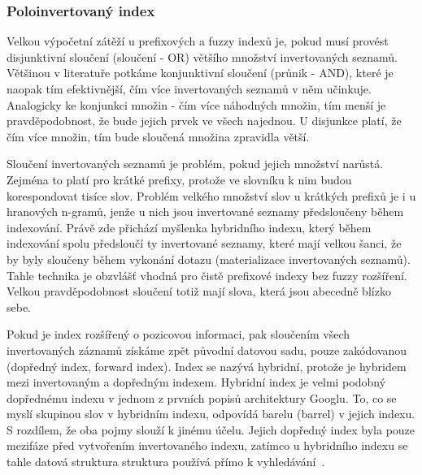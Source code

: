 \documentclass[11pt,letterpaper,oneside,openright]{book}
\begin{document}
\subsubsection{Poloinvertovaný index}
Velkou výpočetní zátěží u prefixových a fuzzy indexů je, pokud musí provést
disjunktivní sloučení (sloučení - OR) většího množství invertovaných seznamů.
Většinou v literatuře potkáme konjunktivní sloučení (průnik - AND), které je
naopak tím efektivnější, čím více invertovaných seznamů v něm učinkuje.
Analogicky ke konjunkci množin - čím více náhodných množin, tím menší je
pravděpodobnost, že bude jejich prvek ve všech najednou. U disjunkce platí, že
čím více množin, tím bude sloučená množina zpravidla větší.

Sloučení invertovaných seznamů je problém, pokud jejich množství narůstá.
Zejména to platí pro krátké prefixy, protože ve slovníku k nim budou
korespondovat tisíce slov. Problém velkého množství slov u krátkých prefixů je
i u hranových n-gramů, jenže u nich jsou invertované seznamy předsloučeny během
indexování. Právě zde přichází myšlenka hybridního indexu, který během
indexování spolu předsloučí ty invertované seznamy, které mají velkou šanci, že
by byly sloučeny během vykonání dotazu (materializace invertovaných seznamů).
Tahle technika je obzvlášť vhodná pro čistě prefixové indexy bez fuzzy
rozšíření. Velkou pravděpodobnost sloučení totiž mají slova, která jsou
abecedně blízko sebe.

Pokud je index rozšířený o pozicovou informaci, pak sloučením všech
invertovaných záznamů získáme zpět původní datovou sadu, pouze zakódovanou
(dopředný index, forward index). Index se nazývá hybridní, protože je hybridem
mezi invertovaným a dopředným indexem. Hybridní index je velmi podobný
dopřednému indexu v jednom z prvních popisů architektury Googlu. To, co se
myslí skupinou slov v hybridním indexu, odpovídá barelu (barrel) v jejich
indexu. S rozdílem, že oba pojmy slouží k jinému účelu. Jejich dopředný index
byla pouze mezifáze před vytvořením invertovaného indexu, zatímco u hybridního
indexu se tahle datová struktura struktura používá přímo k
vyhledávání~\cite{Brin:1998:ALH:297810.297827}.
\end{document}
